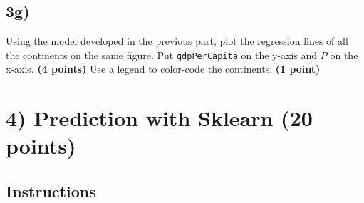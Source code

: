 \documentclass[
  letterpaper,
  DIV=11,
  numbers=noendperiod]{scrreprt}
\begin{document}
\subsection{3g)}\label{g-2}

Using the model developed in the previous part, plot the regression
lines of all the continents on the same figure. Put
\texttt{gdpPerCapita} on the y-axis and \(P\) on the x-axis. \textbf{(4
points)} Use a legend to color-code the continents. \textbf{(1 point)}

\section{4) Prediction with Sklearn (20
points)}\label{prediction-with-sklearn-20-points}

\subsection{Instructions}\label{instructions-2}
\end{document}
